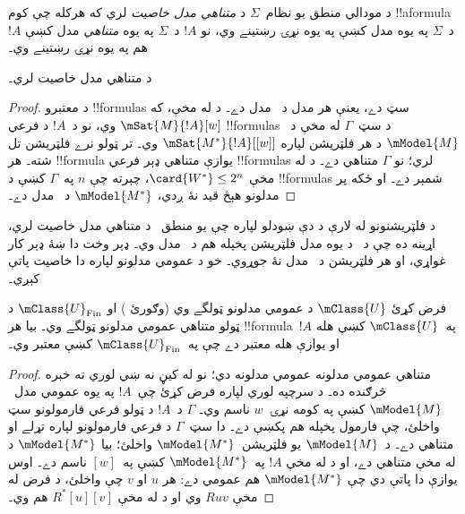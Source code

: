 \documentclass[../../../include/open-logic-section]{subfiles}
\begin{document}


\begin{defn}
  د مودالي منطق يو نظام~$\Sigma$ د \emph{متناهي
    مدل خاصيت} لري که هرکله چې کوم !!a{formula}~$!A$ د~$\Sigma$
  په يوه مدل کښې په يوه نړۍ رښتينے وي، نو $!A$ د~$\Sigma$ په
  يوه \emph{متناهي} مدل کښې هم په يوه نړۍ رښتينے وي۔
\end{defn}

\begin{prop}
   د متناهي مدل خاصيت لري۔
\end{prop}

\begin{proof}
   د معتبرو !!{formula}s سټ دے، يعنې هر مدل د~
  مدل دے۔ د  له مخې، که
  $\mSat{M}{!A}[w]$ وي، نو د~$!A$ د فرعي !!{formula}s د
  سټ~$\Gamma$ له مخې د~$\mModel{M}$ د هر فلټريشن لپاره
  $\mSat{M^*}{!A}[{[w]}]$ وي۔ تر ټولو نرے فلټريشن تل شته۔
  هر !!{formula} يوازې متناهي ډېر فرعي
  !!{formula}s لري؛ نو $\Gamma$ متناهي دے۔ د
   له مخې
  $\card{W^*} \le 2^n$، چېرته چې $n$ په~$\Gamma$ کښې د
  !!{formula}s شمېر دے۔ او ځکه  پر مدلونو هېڅ قيد نۀ ږدي،
  $\mModel{M^*}$ د~ مدل دے۔
\end{proof}

د فلټريشنونو له لارې د دې ښودلو لپاره چې يو منطق~ د متناهي
مدل خاصيت لري، اړينه ده چې د~ د يوه مدل فلټريشن پخپله هم
د~ مدل وي۔ ډېر وخت دا ښۀ ډېر کار غواړي، او هر فلټريشن
د~ مدل نۀ جوړوي۔ خو د عمومي مدلونو لپاره دا خاصيت پاتې
کېږي۔

\begin{prop}
  فرض کړئ $\mClass{U}$ د عمومي مدلونو ټولگے وي (وګورئ
  ) او $\mClass{U}_\mathrm{Fin}$ د
  ټولو متناهي عمومي مدلونو ټولگے وي۔ بيا هر !!{formula}~$!A$
  په~$\mClass{U}$ کښې هله او يوازې هله معتبر دے چې
  په~$\mClass{U}_\mathrm{Fin}$ کښې معتبر وي۔
\end{prop}

\begin{proof}
  متناهي عمومي مدلونه عمومي مدلونه دي؛ نو له کيڼ نه ښي لوري ته
  خبره څرګنده ده۔ د سرچپه لوري لپاره فرض کړئ چې~$!A$ په يوه
  عمومي مدل~$\mModel{M}$ کښې په کومه نړۍ~$w$ ناسم وي۔
  $\Gamma$ د~$!A$ د ټولو فرعي فارمولونو سټ واخلئ، چې فارمول
  پخپله هم پکښې دے۔ دا سټ~$\Gamma$ د فرعي فارمولونو لپاره تړلے او متناهي دے۔ د~$\mModel{M}$ يو
  فلټريشن~$\mModel{M^*}$ واخلئ؛ بيا
  $\mModel{M^*}$ د  له مخې متناهي
  دے، او د  له مخې $!A$
  په~$\mModel{M^*}$ کښې په~$[w]$ ناسم دے۔ اوس يوازې دا پاتې دي
  چې $\mModel{M^*}$ هم عمومي دے: هر $u$ او $v$ چې واخلئ، د فرض
  له مخې $Ruv$ وي او د
   له مخې
  $R^*[u][v]$ هم وي۔
\end{proof}
\end{document}
